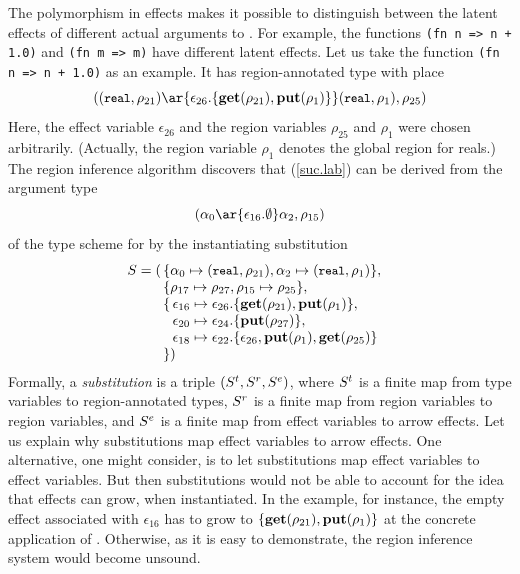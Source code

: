 \documentclass[12pt]{book}
\begin{document}
The polymorphism in effects makes it possible to distinguish between the latent
effects of different actual arguments to . For example, the functions
\lstinline!(fn n => n + 1.0)! and \lstinline!(fn m => m)!  have different latent
effects. Let us take the function \lstinline!(fn n => n + 1.0)! as an
example. It has region-annotated type with place
\begin{equation}
\label{suc.lab}
((\kw{real},\rho_{21})\ar{\epsilon_{26}.\{\Get(\rho_{21}),\Put(\rho_1)\}}(\kw{real}, \rho_1), \rho_{25})
\end{equation}
Here, the effect variable $\epsilon_{26}$ and the region variables $\rho_{25}$
and $\rho_1$ were chosen arbitrarily. (Actually, the region variable $\rho_1$
denotes the global region for reals.) The region inference algorithm discovers
that (\ref{suc.lab}) can be derived from the argument type
$$(\alpha_0\ar{\epsilon_{16}.\emptyset}\alpha_2,\rho_{15})$$
of the type scheme for  by the instantiating substitution
$$S =(\!\!\begin{array}[t]{l}\{\alpha_0\mapsto(\mbox{\small\ttfamily real},\rho_{21}),\alpha_2\mapsto(\mbox{\small\ttfamily real}, \rho_1)\}, \\\{
       \rho_{17}\mapsto\rho_{27},\rho_{15}\mapsto\rho_{25}\},\\
       \{\!\!\begin{array}[t]{l}\epsilon_{16}\mapsto\epsilon_{26}.\{\mathop{\bf get}\nolimits(\rho_{21}),\mathop{\bf put}\nolimits(\rho_1)\},\\
        \epsilon_{20}\mapsto\epsilon_{24}.\{\mathop{\bf put}\nolimits(\rho_{27})\}, \\
        \epsilon_{18}\mapsto\epsilon_{22}.\{\epsilon_{26},\mathop{\bf put}\nolimits(\rho_1),\mathop{\bf get}\nolimits(\rho_{25})\}
       \end{array}\\
       \}
       )
   \end{array}$$
Formally, a
%
%
%
{\em substitution\/} is a triple $(S^t,S^r,S^e)$, where $S^t$ is a finite map
from type variables to region-annotated types, $S^r$ is a finite map from region
variables to region variables, and $S^e$ is a finite map from effect variables
to arrow effects.  Let us explain why substitutions map effect variables to
arrow effects.  One alternative, one might consider, is to let substitutions map
effect variables to effect variables. But then substitutions would not be able
to account for the idea that effects can grow, when instantiated. In the
 example, for instance, the empty effect associated with
$\epsilon_{16}$ has to grow to $\{\mathop{\bf get}\nolimits(\rho_{21}),\mathop{\bf put}\nolimits(\rho_1)\}$ at the
concrete application of . Otherwise, as it is easy to demonstrate, the
region inference system would become unsound.
\end{document}
